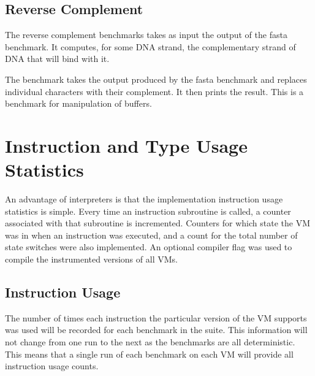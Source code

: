 \documentclass[english,a4paper,12pt]{report}
\begin{document}
\subsection{Reverse Complement}

The reverse complement benchmarks takes as input the output of the
fasta benchmark. It computes, for some DNA strand, the complementary
strand of DNA that will bind with it. 

The benchmark takes the output produced by the fasta benchmark and
replaces individual characters with their complement. It then prints
the result. This is a benchmark for manipulation of buffers.

\section{Instruction and Type Usage Statistics}

An advantage of interpreters is that the implementation instruction
usage statistics is simple. Every time an instruction subroutine is
called, a counter associated with that subroutine is
incremented. Counters for which state the VM was in when an
instruction was executed, and a count for the total number of state
switches were also implemented. An optional compiler flag was used to
compile the instrumented versions of all VMs.

\subsection{Instruction Usage}

The number of times each instruction the particular version of the VM
supports was used will be recorded for each benchmark in the
suite. This information will not change from one run to the next as
the benchmarks are all deterministic. This means that a single run of
each benchmark on each VM will provide all instruction usage counts. 
\end{document}
